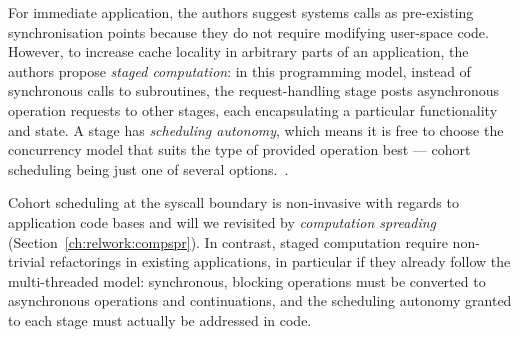 \documentclass[12pt,a4paper]{book}
\begin{document}
For immediate application, the authors suggest systems calls as pre-existing synchronisation points because they do not require modifying user-space code.
However, to increase cache locality in arbitrary parts of an application, the authors propose \emph{staged computation}:
in this programming model, instead of synchronous calls to subroutines, the request-handling stage posts asynchronous operation requests to other stages, each encapsulating a particular functionality and state.
A stage has \emph{scheduling autonomy}, which means it is free to choose the concurrency model that suits the type of provided operation best --- cohort scheduling being just one of several options.~\cite{cohort}.

Cohort scheduling at the syscall boundary is non-invasive with regards to application code bases and will we revisited by \emph{computation spreading} (Section~\ref{ch:relwork:compspr}).
In contrast, staged computation require non-trivial refactorings in existing applications, in particular if they already follow the multi-threaded model:
synchronous, blocking operations must be converted to asynchronous operations and continuations, and the scheduling autonomy granted to each stage must actually be addressed in code.
\end{document}
